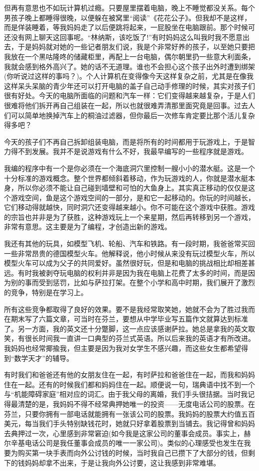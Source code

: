 \documentclass[12pt,UTF8]{ctexbook}
\begin{document}
但再有意思也不如玩计算机过瘾。只要屋里摆着电脑，晚上不睡觉都没关系。每个男孩子晚上都睡得很晚，以便躲在被窝里“阅读”《花花公子》。但我却不是这样，而是佯装睡着，等我妈妈走了以后便跳将起来，一屁股坐在电脑跟前。那个时候可还没有网上聊天这回事呢。“林纳斯，该吃饭了!”有时妈妈这么叫我时我不愿意出去，于是妈妈就对她的一些记者朋友们说，我是个非常好养的孩子，以至她只要把我放在一个黑咕隆咚的储藏柜里，再配上一台电脑，偶尔朝里扔一些意大利面条，我就会感到格外高兴了。她的话不无道理。谁也不会担心这个孩子出外时遭到绑架(你听说过这样的事吗？)。个人计算机在变得像今天这样复杂之前，尤其是在像我这样呆头呆脑的青少年还可以打开电脑的盖子自己动手修理的时候，其实对孩子们很有好处。今天的电脑所面临的问题和汽车一样：它们变得越来越复杂，于是人们很难将他们拆开再自己组装在一起，所以也就很难弄清那里面究竟是回事。过去人们可以简单地换掉汽车上的桐油过滤器，但你最后一次修车肯定要比那个活儿复杂得多吧？

今天的孩子们不再自己拆卸组装电脑，而是将所有的时间都用于玩游戏上，于是智力得不到发展。我并不是说游戏有什么不好，我最早编写的一些程序就是游戏。

我编的程序中有一个是你必须在一个海底洞穴里控制一艘小小的潜水艇。这是一个十分标准的游戏概念。整个世界都倾斜着移动，作为玩游戏的人，你就是潜水艇本身，所以你必须不能让自己碰到墙壁和可怕的大鱼身上。其实真正移动的仅仅是这个游戏空间，鱼是这个游戏空间的一部分，是和它一起移动的。你玩的时间越长，它们移动得就越快，同时洞穴还变得越来越小。你不可能在这个游戏中获胜。游戏的宗旨也并非是为了获胜，这种游戏玩上一个来星期，然后再转移到另一个游戏，非常有意思。这主要是为了编程，才创造出新的游戏。

我还有其他的玩具，如模型飞机、轮船、汽车和铁路。有一段时期，我爸爸常买回一些非常昂贵的德国模型火车。他解释说，他小时候从来没有玩过模型火车，所以模型火车可以成为父子的共同爱好。虽然很好玩，但是和电脑的挑战相比却相差甚远。有时我被剥夺玩电脑的权利并非是因为我在电脑上花费了太多的时间，而是因为别的事而受到惩罚，比如与萨拉打架。在整个小学和高中时期，我们展开了激烈的竞争，特别是在学习上。

所有这些竞争都取得了良好的效果。要不是我经常取笑她，她就不会为了胜过我而在期末写了六篇文章，可当时在芬兰，要想从中学毕业写五篇作文就算达到标准了。另一方面，我的英文还十分蹩脚，这一点应该感谢萨拉。她总是拿我的英文取笑，有很长时间我一直讲一口典型的芬兰式英语。所以后来我的英语才有所改进。我妈妈也经常揶揄我，但主要是因为我对女学生不感兴趣，而这些女生都希望得到“数学天才”的辅导。

有时我们和爸爸还有他的女朋友住在一起，有时萨拉和爸爸住在一起，而我和妈妈住在一起。还有的时候我们都和妈妈住在一起。顺便说一句，瑞典语中找不到一个与“机能障碍家庭”相对应的词汇。由于我父母的离婚，我们手头很拮据。当时我记得最清楚的是，我妈妈不得不经常典押她唯一的投资——无度电话公司的股票。在芬兰，只要你拥有一部电话就能拥有一张该公司的股票。我妈妈的股票大约值五百美元，每当我们手头特别缺钱花时，她就只好拿着股票到当铺去。我记得曾和妈妈去典押过一次，心里感到非常窘迫(如今我是这家公司的董事会成员。事实上，赫尔辛基电话公司是我任董事会成员的唯一一家公司)。类似的心理感受也发生在我要为购买第一块手表而向外公讨钱的时候，当时我自己已攒下了大部分的钱，但剩下的钱妈妈却拿不出来，于是让我向外公讨要，这让我感到非常难堪。
\end{document}
